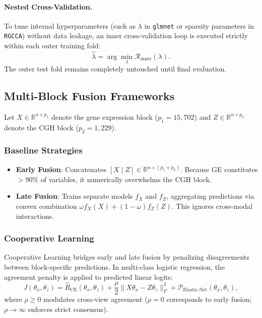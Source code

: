 \documentclass[a4paper,11pt]{paper}
\theoremstyle{plain}
\theoremstyle{definition}
\theoremstyle{remark}
\begin{document}
\paragraph{Nested Cross-Validation.}
To tune internal hyperparameters (such as $\lambda$ in \texttt{glmnet} or sparsity parameters in \texttt{RGCCA}) without data leakage, an inner cross-validation loop is executed strictly within each outer training fold:
$$\hat \lambda = \arg\min_\lambda \widehat{\mathcal{R}}_{\text{inner}}(\lambda).$$
The outer test fold remains completely untouched until final evaluation.

\subsection{Multi-Block Fusion Frameworks}

Let $X \in \mathbb{R}^{n \times p_1}$ denote the gene expression block ($p_1 = 15{,}702$) and $Z \in \mathbb{R}^{n \times p_2}$ denote the CGH block ($p_2 = 1{,}229$).

\subsubsection{Baseline Strategies}
\begin{itemize}
    \item \textbf{Early Fusion}: Concatenates $[X \mid Z] \in \mathbb{R}^{n \times (p_1 + p_2)}$. Because GE constitutes $> 90\%$ of variables, it numerically overwhelms the CGH block.
    \item \textbf{Late Fusion}: Trains separate models $f_X$ and $f_Z$, aggregating predictions via convex combination $\omega f_X(X) + (1-\omega) f_Z(Z)$. This ignores cross-modal interactions.
\end{itemize}

\subsubsection{Cooperative Learning}
Cooperative Learning \cite{ding2022cooperative} bridges early and late fusion by penalizing disagreements between block-specific predictions. In multi-class logistic regression, the agreement penalty is applied to predicted linear logits:
$$J(\theta_x, \theta_z) = \hat{R}_{\text{CE}}(\theta_x, \theta_z) + \frac{\rho}{2}\|X\theta_x - Z\theta_z\|_F^2 + \mathcal{P}_{\text{Elastic-Net}}(\theta_x, \theta_z),$$
where $\rho \ge 0$ modulates cross-view agreement ($\rho = 0$ corresponds to early fusion; $\rho \to \infty$ enforces strict consensus).
\end{document}
